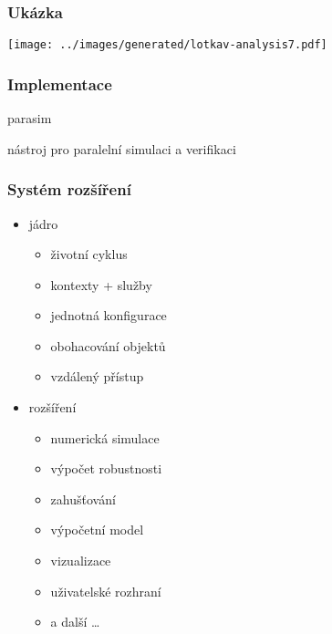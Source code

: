 \documentclass[xcolor=svgnames]{beamer}
\begin{document}
\begin{frame}
	\frametitle{Ukázka}
	\begin{center}
		\texttt{[image: ../images/generated/lotkav-analysis7.pdf]}
	\end{center}
\end{frame}
\begin{frame}
	\frametitle{Implementace}
	\begin{center}
		{\Huge \alert{parasim}}

		\bigskip
		nástroj pro paralelní simulaci a verifikaci
	\end{center}
\end{frame}
\begin{frame}
	\frametitle{Systém rozšíření}
	\begin{itemize}
		\item<1->	\alert{jádro}
				\begin{itemize}
					\item	životní cyklus
					\item	kontexty + služby
					\item	jednotná konfigurace
					\item	obohacování objektů
					\item	vzdálený přístup
				\end{itemize}

		\item<1->	\alert{rozšíření}
				\begin{itemize}
					\item	numerická simulace
					\item	výpočet robustnosti
					\item	zahušťování
					\item	výpočetní model
					\item	vizualizace
					\item	uživatelské rozhraní
					\item	a další \ldots
				\end{itemize}
	\end{itemize}
\end{frame}
\end{document}
